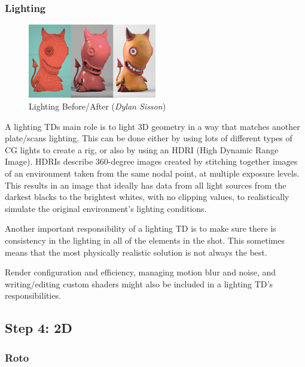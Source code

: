 \hypertarget{lighting}{%
\subsubsection{Lighting}\label{lighting}}

\begin{figure}
\includegraphics[width=0.5\textwidth,height=\textheight]{./images/lighting_before_after.png}
\caption{Lighting Before/After (\emph{Dylan Sisson})}
\end{figure}

A lighting TDs main role is to light 3D geometry in a way that matches another plate/scans lighting. This can be done either by using lots of different types of CG lights to create a rig, or also by using an HDRI (High Dynamic Range Image). HDRIs describe 360-degree images created by stitching together images of an environment taken from the same nodal point, at multiple exposure levels. This results in an image that ideally has data from all light sources from the darkest blacks to the brightest whites, with no clipping values, to realistically simulate the original environment's lighting conditions.

Another important responsibility of a lighting TD is to make sure there is consistency in the lighting in all of the elements in the shot. This sometimes means that the most physically realistic solution is not always the best.

Render configuration and efficiency, managing motion blur and noise, and writing/editing custom shaders might also be included in a lighting TD's responsibilities.

\hypertarget{step-4-2d}{%
\subsection{Step 4: 2D}\label{step-4-2d}}

\hypertarget{roto}{%
\subsubsection{Roto}\label{roto}}

